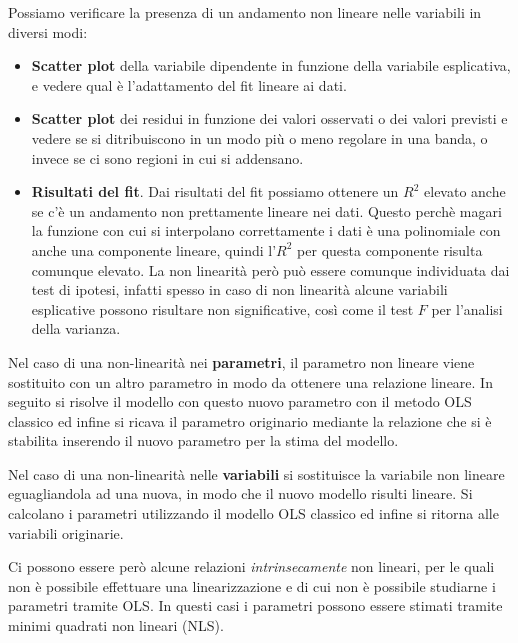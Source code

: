 Possiamo verificare la presenza di un andamento non lineare nelle variabili in diversi modi:
\begin{itemize}
	\item \textbf{Scatter plot} della variabile dipendente in funzione della variabile esplicativa, e vedere qual è l'adattamento del fit lineare ai dati.
	\item \textbf{Scatter plot} dei residui in funzione dei valori osservati o dei valori previsti e vedere se si ditribuiscono in un modo più o meno regolare in una banda, o invece se ci sono regioni in cui si addensano.
	\item \textbf{Risultati del fit}. Dai risultati del fit possiamo ottenere un $R^2$ elevato anche se c'è un andamento non prettamente lineare nei dati. Questo perchè magari la funzione con cui si interpolano correttamente i dati è una polinomiale con anche una componente lineare, quindi l'$R^2$ per questa componente risulta comunque elevato. La non linearità però può essere comunque individuata dai test di ipotesi, infatti spesso in caso di non linearità alcune variabili esplicative possono risultare non significative, così come il test $F$ per l'analisi della varianza. 
\end{itemize}

Nel caso di una non-linearità nei \textbf{parametri}, il parametro non lineare viene sostituito con un altro parametro in modo da ottenere una relazione lineare. In seguito si risolve il modello con questo nuovo parametro con il metodo OLS classico ed infine si ricava il parametro originario mediante la relazione che si è stabilita inserendo il nuovo parametro per la stima del modello.

Nel caso di una non-linearità nelle \textbf{variabili} si sostituisce la variabile non lineare eguagliandola ad una nuova, in modo che il nuovo modello risulti lineare. Si calcolano i parametri utilizzando il modello OLS classico ed infine si ritorna alle variabili originarie.

Ci possono essere però alcune relazioni \textit{intrinsecamente} non lineari, per le quali non è possibile effettuare una linearizzazione e di cui non è possibile studiarne i parametri tramite OLS. In questi casi i parametri possono essere stimati tramite minimi quadrati non lineari (NLS).

